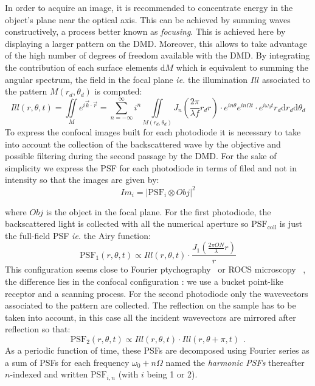 \documentclass[%
reprint,
 amsmath,amssymb,
 aps,
]{revtex4-2}
\newcommand{\dd}{\mathrm{d}}
\begin{document}
In order to acquire an image, it is recommended to concentrate energy in the object's plane near the optical axis. This can be achieved by summing waves constructively, a process better known as \textit{focusing}. This is achieved here by displaying a larger pattern on the DMD. Moreover, this allows to take advantage of the high number of degrees of freedom available with the DMD. By integrating the contribution of each surface elements $\dd M$ which is equivalent to summing the angular spectrum, the field in the focal plane \textit{ie.} the illumination $Ill$ associated to the pattern $M(r_d,\theta_d)$ is computed:
\begin{equation} \label{s_pf_tot}
    Ill(r,\theta,t)=\iint \limits_{M} e^{i \overrightarrow{k}\cdot \overrightarrow{r}}= \sum \limits_{n=-\infty}^{\infty} i^n \iint \limits_{M(r_d,\theta_d)} J_n \left(\frac{2 \pi}{\lambda f}r_d r \right) \cdot e^{in\theta}  e^{in\Omega t} \cdot e^{i\omega_0 t}  r_d \dd r_d \dd \theta_d
\end{equation}
To express the confocal images built for each photodiode it is necessary to take into account the collection of the backscattered wave by the objective and possible filtering during the second passage by the DMD. For the sake of simplicity we express the PSF for each photodiode in terms of filed and not in intensity so that the images are given by:
\begin{equation} \label{Im}
    Im_i= |\textrm{PSF}_i \otimes Obj|^2
\end{equation}

where $Obj$ is the object in the focal plane.
For the first photodiode, the backscattered light is collected with all the numerical aperture so $\textrm{PSF}_{\textrm{coll}}$ is just the full-field PSF \textit{ie.} the Airy function:
\begin{equation}\label{PSF1}
    \textrm{PSF}_{1}(r,\theta,t) \propto Ill(r,\theta,t)\cdot \frac{J_{1}\left(\frac{2\pi ON }{\lambda}r\right)}{r}
\end{equation}
This configuration seems close to Fourier ptychography~\cite{PtychoFourier} or ROCS microscopy ~\cite{ROCSmicroRohrbach}, the difference lies in the confocal configuration : we use a bucket point-like receptor and a scanning process.
For the second photodiode only the wavevectors associated to the pattern are collected. The reflection on the sample has to be taken into account, in this case all the incident wavevectors are mirrored after reflection so that:
\begin{equation}\label{PSF2}
    \textrm{PSF}_{2}(r,\theta,t) \propto Ill(r,\theta,t)\cdot Ill(r,\theta+\pi,t) \ \ .
\end{equation}
As a periodic function of time, these PSFs are decomposed using Fourier series as a sum of PSFs for each frequency $\omega_0+n \Omega$ named the \textit{harmonic PSFs} thereafter $n$-indexed and written $\textrm{PSF}_{i,n}$ (with $i$ being 1 or 2).
\end{document}
